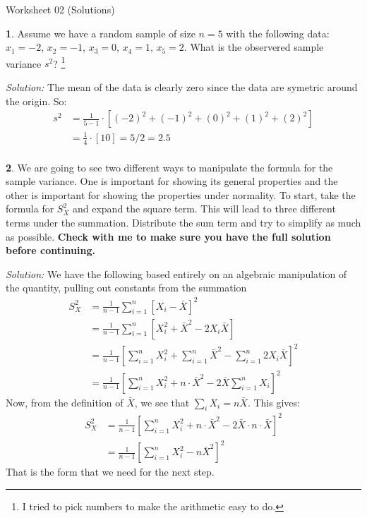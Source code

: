 \documentclass{tufte-handout}
\begin{document}
\justify

{\LARGE Worksheet 02 (Solutions)}

\vspace*{18pt}


\textbf{1}. Assume we have a random sample of size $n = 5$ with the following data:
$x_1 = -2$, $x_2 = -1$, $x_3 = 0$, $x_4 = 1$, $x_5 = 2$. What is the observered
sample variance $s^2$? 
\footnote{
  I tried to pick numbers to make the arithmetic easy to do. 
}

\textit{Solution:} The mean of the data is clearly zero since the data are symetric around the
origin. So:
\begin{align*}
s^2 &= \frac{1}{5 - 1} \cdot \left[(-2)^2 + (-1)^2 + (0)^2 + (1)^2 + (2)^2 \right] \\
&= \frac{1}{4} \cdot \left[10 \right] = 5/2 = 2.5 \\
\end{align*}

\textbf{2}. We are going to see two different ways to manipulate the formula for the 
sample variance. One is important for showing its general properties and
the other is important for showing the properties under normality. To start,
take the formula for $S^2_X$ and expand the square term. This will lead to
three different terms under the summation. Distribute the sum term and
try to simplify as much as possible. \textbf{Check with me to make sure
you have the full solution before continuing.}

\textit{Solution:} We have the following based entirely on an algebraic manipulation of the
quantity, pulling out constants from the summation
\begin{align*}
S^2_X &= \frac{1}{n-1} \sum_{i=1}^n \left[X_i - \bar{X} \right]^2 \\
&= \frac{1}{n-1} \sum_{i=1}^n \left[X_i^2 + \bar{X}^2 - 2 X_i \bar{X} \right] \\
&= \frac{1}{n-1} \left[ \sum_{i=1}^n X_i^2 + \sum_{i=1}^n \bar{X}^2 - \sum_{i=1}^n 2 X_i \bar{X} \right]^2 \\
&= \frac{1}{n-1} \left[ \sum_{i=1}^n X_i^2 + n \cdot \bar{X}^2 - 2 \bar{X} \sum_{i=1}^n X_i \right]^2
\end{align*}
Now, from the definition of $\bar{X}$, we see that $\sum_i X_i = n \bar{X}$.
This gives:
\begin{align*}
S^2_X &= \frac{1}{n-1} \left[ \sum_{i=1}^n X_i^2 + n \cdot \bar{X}^2 - 2 \bar{X} \cdot n \cdot \bar{X} \right]^2 \\
&= \frac{1}{n-1} \left[ \sum_{i=1}^n X_i^2 - n \bar{X}^2 \right]^2
\end{align*}
That is the form that we need for the next step.
\end{document}
